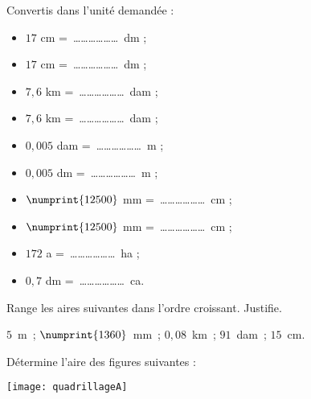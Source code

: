\begin{exercice}
Convertis dans l’unité demandée :
\begin{itemize}
 \item $17$ cm = \ldots \ldots \ldots \ldots \ldots \ldots dm ;
 \item $17$ cm = \ldots \ldots \ldots \ldots \ldots \ldots dm ;
 \item $7,6$ km = \ldots \ldots \ldots \ldots \ldots \ldots dam ;
 \item $7,6$ km = \ldots \ldots \ldots \ldots \ldots \ldots dam ;
 \item $0,005$ dam = \ldots \ldots \ldots \ldots \ldots \ldots m ;
 \item $0,005$ dm = \ldots \ldots \ldots \ldots \ldots \ldots m ;
 \item $\numprint{12500}$ mm = \ldots \ldots \ldots \ldots \ldots \ldots cm ;
 \item $\numprint{12500}$ mm = \ldots \ldots \ldots \ldots \ldots \ldots cm ;
 \item $172$ a = \ldots \ldots \ldots \ldots \ldots \ldots ha ;
 \item $0,7$ dm = \ldots \ldots \ldots \ldots \ldots \ldots ca.
 \end{itemize}
\end{exercice}


\begin{exercice}
Range les aires suivantes dans l'ordre croissant. Justifie.

\begin{center} $5$ m ; $\numprint{1360}$ mm ; $0,08$ km ; $91$ dam ; $15$ cm. \end{center}
\end{exercice}


\vspace{1em}





\begin{exercice}
Détermine l'aire des figures suivantes :

\begin{center} \texttt{[image: quadrillageA]} \end{center}
\end{exercice}


